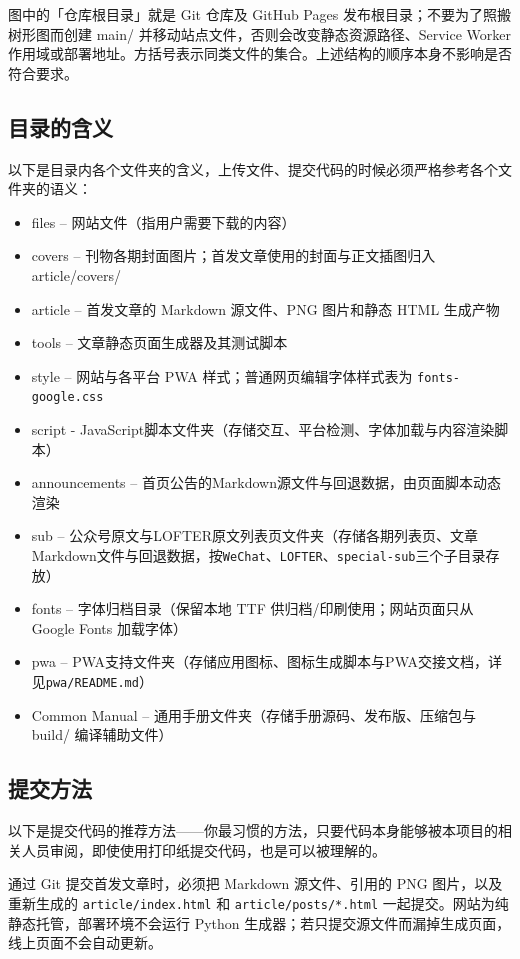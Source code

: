 \documentclass[fontset=fandol]{ctexrep}
\begin{document}
{\kaishu 图中的「仓库根目录」就是 Git 仓库及 GitHub Pages 发布根目录；不要为了照搬树形图而创建 main/ 并移动站点文件，否则会改变静态资源路径、Service Worker 作用域或部署地址。方括号表示同类文件的集合。上述结构的顺序本身不影响是否符合要求。}

\subsection{目录的含义}

以下是目录内各个文件夹的含义，上传文件、提交代码的时候{\heiti 必须}严格参考各个文件夹的语义：

{\kaishu \begin{itemize}
	\item{files – 网站文件（指用户需要下载的内容）}
	\item{covers – 刊物各期封面图片；首发文章使用的封面与正文插图归入 article/covers/}
	\item{article – 首发文章的 Markdown 源文件、PNG 图片和静态 HTML 生成产物}
	\item{tools – 文章静态页面生成器及其测试脚本}
	\item{style – 网站与各平台 PWA 样式；普通网页编辑字体样式表为 \verb|fonts-google.css|}
	\item{script - JavaScript脚本文件夹（存储交互、平台检测、字体加载与内容渲染脚本）}
	\item{announcements – 首页公告的Markdown源文件与回退数据，由页面脚本动态渲染}
	\item{sub – 公众号原文与LOFTER原文列表页文件夹（存储各期列表页、文章Markdown文件与回退数据，按\verb|WeChat|、\verb|LOFTER|、\verb|special-sub|三个子目录存放）}
	\item{fonts – 字体归档目录（保留本地 TTF 供归档/印刷使用；网站页面只从 Google Fonts 加载字体）}
	\item{pwa – PWA支持文件夹（存储应用图标、图标生成脚本与PWA交接文档，详见\verb|pwa/README.md|）}
	\item{Common Manual – 通用手册文件夹（存储手册源码、发布版、压缩包与 build/ 编译辅助文件）}
\end{itemize}}

\subsection{提交方法}

以下是提交代码的推荐方法——你最习惯的方法，只要代码本身能够被本项目的相关人员审阅，即使使用打印纸提交代码，也是可以被理解的。

通过 Git 提交首发文章时，必须把 Markdown 源文件、引用的 PNG 图片，以及重新生成的 \verb|article/index.html| 和 \verb|article/posts/*.html| 一起提交。网站为纯静态托管，部署环境不会运行 Python 生成器；若只提交源文件而漏掉生成页面，线上页面不会自动更新。
\end{document}
